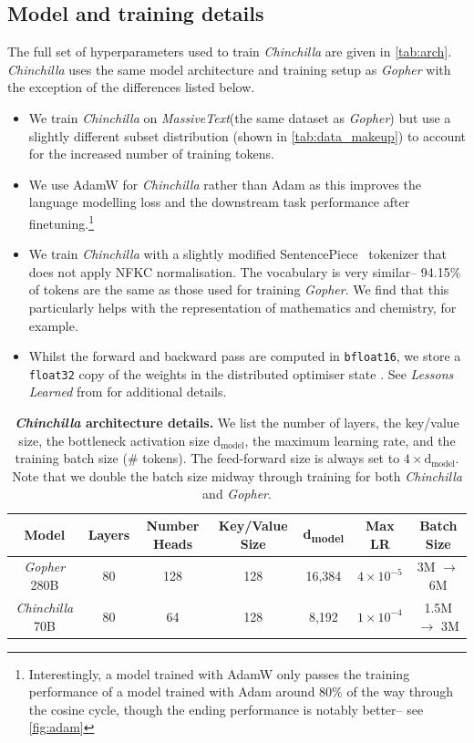 \documentclass[11pt, a4paper, logo, copyright, nonumbering]{deepmind}
\newcommand{\massivetext}{\textit{MassiveText}\xspace}
\newcommand{\gopher}{\textit{Gopher}\xspace}
\newcommand{\chinchilla}{\textit{Chinchilla}\xspace}
\begin{document}
\subsection{Model and training details}
\label{method:models}
The full set of hyperparameters used to train \chinchilla are given in \autoref{tab:arch}.
\chinchilla uses the same model architecture and training setup as \gopher with the exception of the differences listed below. 
\begin{itemize}
    \item We train \chinchilla on \massivetext (the same dataset as \gopher) but use a slightly different subset distribution (shown in \autoref{tab:data_makeup}) to account for the increased number of training tokens.
    \item We use AdamW \citep{loshchilov2018decoupled} for \chinchilla rather than Adam \citep{kingma2014adam} as this improves the language modelling loss and the downstream task performance after finetuning.\footnote{Interestingly, a model trained with AdamW only passes the training performance of a model trained with Adam around 80\% of the way through the cosine cycle, though the ending performance is notably better-- see \autoref{fig:adam}} 
    \item We train \chinchilla with a slightly modified SentencePiece~\citep{kudo2018sentencepiece} tokenizer that does not apply NFKC normalisation. The vocabulary is very similar-- 94.15\% of tokens are the same as those used for training \gopher. 
    We find that this particularly helps with the representation of mathematics and chemistry, for example.
    \item Whilst the forward and backward pass are computed in \texttt{bfloat16}, we store a \texttt{float32} copy of the weights in the distributed optimiser state \citep{rajbhandari2020zero}. See \textit{Lessons Learned} from \citet{rae2021gopher} for additional details.
\end{itemize}

\begin{table}[b]
    \centering
    \begin{tabular}{ccccccc}
    \toprule
        \textbf{Model} & \textbf{Layers} & \textbf{Number Heads} & \textbf{Key/Value Size} & \textbf{d\textsubscript{model}} & \textbf{Max LR}  & \textbf{Batch Size} \\ 
        \midrule
         \gopher 280B & 80 & 128 & 128 & 16,384 & $4 \times 10^{-5}$ & 3M $\rightarrow$ 6M\\ 
         \chinchilla 70B & 80 & 64 & 128 & 8,192 & $1 \times 10^{-4}$ & 1.5M $\rightarrow$ 3M\\ 
         \bottomrule
    \end{tabular}
    \caption{\textbf{\chinchilla architecture details.} We list the number of layers, the key/value size, the bottleneck activation size d$_{\text{model}}$, the maximum learning rate, and the training batch size (\# tokens). The feed-forward size is always set to $4\times \textrm{d}_{\textrm{model}}$. Note that we double the batch size midway through training for both \chinchilla and \gopher.}
    \label{tab:arch}
\end{table}
\end{document}
